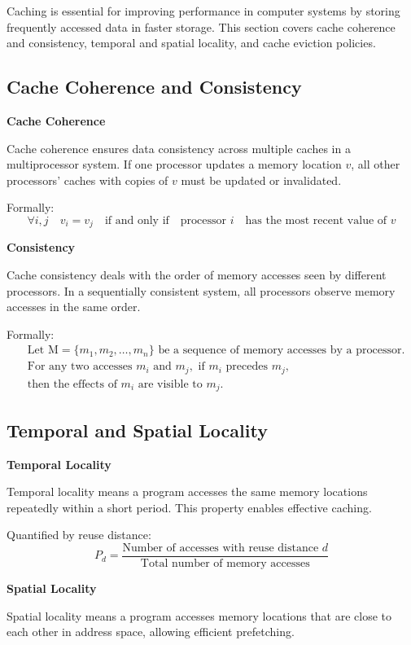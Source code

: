 \documentclass[12pt]{book} %
\begin{document}
Caching is essential for improving performance in computer systems by storing frequently accessed data in faster storage. This section covers cache coherence and consistency, temporal and spatial locality, and cache eviction policies.

\subsection{Cache Coherence and Consistency}

\textbf{Cache Coherence}

Cache coherence ensures data consistency across multiple caches in a multiprocessor system. If one processor updates a memory location \(v\), all other processors' caches with copies of \(v\) must be updated or invalidated.

Formally:
\[
\forall i, j \quad v_i = v_j \quad \text{if and only if} \quad \text{processor } i \quad \text{has the most recent value of } v
\]

\textbf{Consistency}

Cache consistency deals with the order of memory accesses seen by different processors. In a sequentially consistent system, all processors observe memory accesses in the same order.

Formally:
\[
\begin{aligned}
&\text{Let } \text{M} = \{m_1, m_2, \ldots, m_n\} \text{ be a sequence of memory accesses by a processor.} \\
&\text{For any two accesses } m_i \text{ and } m_j, \text{ if } m_i \text{ precedes } m_j, \\
&\text{then the effects of } m_i \text{ are visible to } m_j.
\end{aligned}
\]

\subsection{Temporal and Spatial Locality}

\textbf{Temporal Locality}

Temporal locality means a program accesses the same memory locations repeatedly within a short period. This property enables effective caching.

Quantified by reuse distance:
\[
P_d = \frac{\text{Number of accesses with reuse distance } d}{\text{Total number of memory accesses}}
\]

\textbf{Spatial Locality}

Spatial locality means a program accesses memory locations that are close to each other in address space, allowing efficient prefetching.
\end{document}
